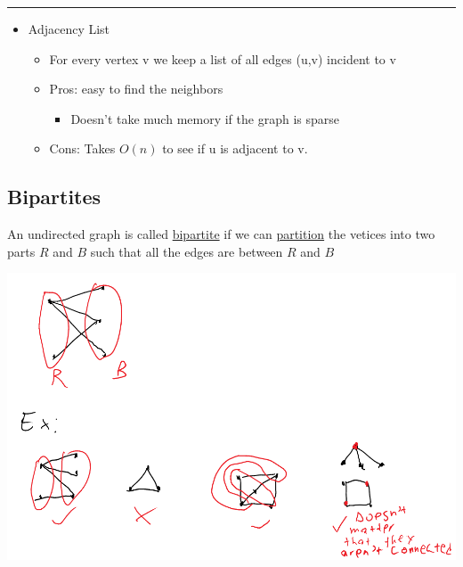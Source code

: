 \documentclass[11pt]{article}
\begin{document}
\noindent\rule{\textwidth}{0.5pt}
\begin{itemize}
\item Adjacency List
\begin{itemize}
\item For every vertex v we keep a list of all edges (u,v) incident to v
\item Pros: easy to find the neighbors
\begin{itemize}
\item Doesn't take much memory if the graph is sparse
\end{itemize}
\item Cons: Takes \(O(n)\) to see if u is adjacent to v.
\end{itemize}
\end{itemize}
\subsection{Bipartites}
\label{sec:org4ae4723}
An undirected graph is called \uline{bipartite} if we can \uline{partition} the vetices into two parts \(R\) and \(B\) such that all the edges are between \(R\) and \(B\)
\begin{center}
\includegraphics[width=.9\linewidth]{./Images/i19.png}
\end{center}
\end{document}
